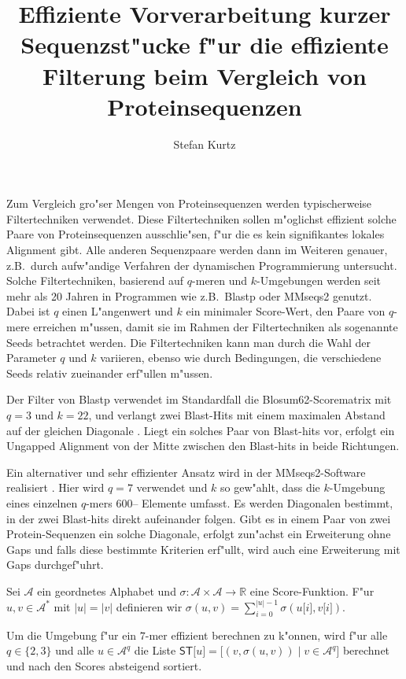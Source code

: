 \documentclass[12pt,a4paper]{scrartcl}
\title{Effiziente Vorverarbeitung kurzer Sequenzst"ucke f"ur die
effiziente Filterung beim Vergleich von Proteinsequenzen}
\author{Stefan Kurtz}
\newcommand{\Subchar}[2]{#1\lbrack #2\rbrack}
\newcommand{\Scoretablename}[0]{\mathsf{ST}}
\newcommand{\Scoretable}[1]{\Scoretablename\lbrack #1\rbrack}
\newcommand{\Reals}{\mathbb{R}}
\newcommand{\Alpha}[0]{\mathcal{A}}
\begin{document}
\maketitle

Zum Vergleich gro"ser Mengen von Proteinsequenzen werden typischerweise
Filtertechniken verwendet. Diese Filtertechniken sollen m"oglichst effizient
solche Paare von Proteinsequenzen ausschlie"sen, f"ur die es kein signifikantes
lokales Alignment gibt. Alle anderen Sequenzpaare werden dann im Weiteren
genauer, z.B.\ durch aufw"andige Verfahren der dynamischen Programmierung
untersucht. Solche Filtertechniken, basierend auf \(q\)-meren
und \(k\)-Umgebungen werden seit mehr als 20 Jahren
in Programmen wie z.B.\ Blastp oder MMseqs2 genutzt. Dabei ist
\(q\) einen L"angenwert und
\(k\) ein minimaler Score-Wert, den Paare von \(q\)-mere erreichen m"ussen,
damit sie im Rahmen der Filtertechniken als sogenannte Seeds
betrachtet werden. Die Filtertechniken kann man durch die Wahl der Parameter
\(q\) und \(k\) variieren, ebenso wie durch Bedingungen, die verschiedene
Seeds relativ zueinander erf"ullen m"ussen.

Der Filter von Blastp verwendet im Standardfall die Blosum62-Scorematrix mit
\(q=3\) und \(k=22\), und verlangt zwei Blast-Hits mit einem
maximalen Abstand auf der gleichen Diagonale
\cite{ALT:MAD:SCHAE:ZHA:ZHA:MIL:LIP:1997}. Liegt ein solches Paar von
Blast-hits vor, erfolgt ein Ungapped Alignment von der Mitte zwischen den
Blast-hits in beide Richtungen.

Ein alternativer und sehr effizienter Ansatz wird in der MMseqs2-Software
realisiert
\cite{STE:SOED:2017}. Hier wird \(q=7\) verwendet und \(k\) so gew"ahlt,
dass die \(k\)-Umgebung eines einzelnen \(q\)-mers 600--
Elemente umfasst. Es werden Diagonalen bestimmt, in der zwei Blast-hits direkt
aufeinander folgen. Gibt es in einem Paar von zwei Protein-Sequenzen
ein solche Diagonale, erfolgt zun"achst ein Erweiterung ohne Gaps und
falls diese bestimmte Kriterien erf"ullt, wird auch eine Erweiterung mit Gaps
durchgef"uhrt.

Sei \(\Alpha\) ein geordnetes Alphabet und
\(\sigma:\Alpha\times\Alpha\to\Reals\)  eine Score-Funktion. F"ur
\(u,v\in\Alpha^{\ast}\) mit \(|u|=|v|\) definieren wir
\(\sigma(u,v)=\sum_{i=0}^{|u|-1}\sigma(\Subchar{u}{i},\Subchar{v}{i})\).

Um die Umgebung f"ur ein \(7\)-mer effizient berechnen zu k"onnen,
wird f"ur alle \(q\in\{2,3\}\) und alle \(u\in\Alpha^{q}\) die
Liste \(\Scoretable{u}=\lbrack (v,\sigma(u,v))\mid v\in\Alpha^{q}\rbrack\)
berechnet und nach den Scores absteigend sortiert.
\end{document}

